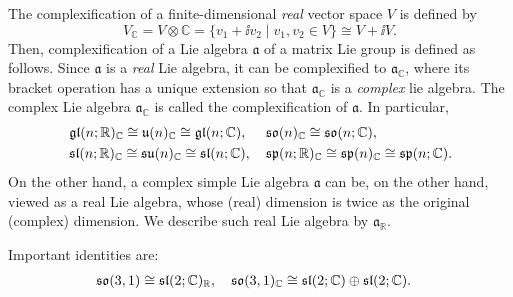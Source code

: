 \documentclass[CheatSheet]{subfiles}
\begin{document}
The complexification of a finite-dimensional \emph{real} vector space $V$ is defined by
\begin{equation}
 V_{\mathbb C}=V\otimes\mathbb C=\{v_1+\ii v_2\mathbin|v_1,v_2\in V\}\cong V+\ii V.
\end{equation}
Then, complexification of a Lie algebra $\mathfrak a$ of a matrix Lie group is defined as follows.
Since $\mathfrak a$ is a \emph{real} Lie algebra, it can be complexified to $\mathfrak a_{\mathbb C}$, where its bracket operation has a unique extension so that $\mathfrak a_{\mathbb C}$ is a \emph{complex} lie algebra.
The complex Lie algebra $\mathfrak a_{\mathbb C}$ is called the complexification of $\mathfrak a$.
In particular,
\begin{align}\notag
 &
 \mathop{\mathfrak{gl}}(n;\mathbb R)_{\mathbb C}
 \cong \mathop{\mathfrak{u}}(n)_{\mathbb C}
 \cong \mathop{\mathfrak{gl}}(n;\mathbb C),&
 &
 \mathop{\mathfrak{so}}(n)_{\mathbb C}
 \cong \mathop{\mathfrak{so}}(n;\mathbb C),\\
 &
 \mathop{\mathfrak{sl}}(n;\mathbb R)_{\mathbb C}
 \cong \mathop{\mathfrak{su}}(n)_{\mathbb C}
 \cong \mathop{\mathfrak{sl}}(n;\mathbb C),&
 &
 \mathop{\mathfrak{sp}}(n;\mathbb R)_{\mathbb C}
 \cong \mathop{\mathfrak{sp}}(n)_{\mathbb C}
 \cong \mathop{\mathfrak{sp}}(n;\mathbb C).
\end{align}
On the other hand, a complex simple Lie algebra $\mathfrak a$ can be, on the other hand, viewed as a real Lie algebra, whose (real) dimension is twice as the original (complex) dimension.
We describe such real Lie algebra by $\mathfrak a_{\mathbb R}$.

Important identities are:
\begin{align}
 &\operatorname{\mathfrak{so}}(3,1)\cong \operatorname{\mathfrak{sl}}(2;\mathbb C)_{\mathbb R},&
 &\operatorname{\mathfrak{so}}(3,1)_{\mathbb C}\cong \operatorname{\mathfrak{sl}}(2;\mathbb C)\oplus\operatorname{\mathfrak{sl}}(2;\mathbb C).
\end{align}
\end{document}
